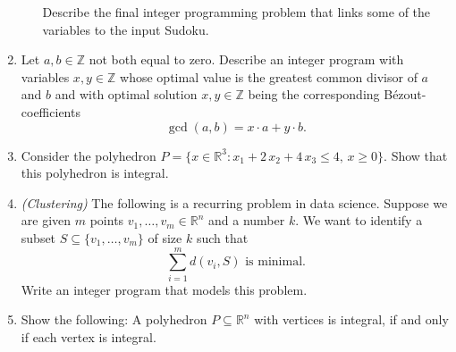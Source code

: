 \documentclass[11pt]{article}
\newcommand{\setR}{\mathbb{R}}
\renewcommand{\leq}{\leqslant}
\renewcommand{\geq}{\geqslant}
\begin{document}
\begin{enumerate}[1)]
\begin{enumerate}[a)]
    Describe the final integer programming problem that links some of the variables to the input Sudoku. 
    
  \end{enumerate}

\item Let $a, b ∈ℤ$ not both equal to zero. Describe an integer program with variables $x,y ∈ℤ$ whose optimal value is the greatest common divisor of $a$ and $b$ and with optimal solution $x,y ∈ℤ$ being the corresponding  Bézout-coefficients
  \begin{displaymath}
    \gcd(a,b) = x⋅a + y⋅b. 
  \end{displaymath}
  
 \item Consider the polyhedron $P = \{ x \in \setR^3 \colon x_1 + 2\,x_2 + 4\,
  x_3 \leq 4, \, x\geq0\}$. Show that this polyhedron is
  integral. 

\item \emph{(Clustering)} The following is a recurring problem in data science. Suppose we are given $m$ points $v_1,\dots,v_m ∈ ℝ^n$ and a number $k$. We want to identify a subset $S ⊆ \{v_1,\dots,v_m\}$ of size $k$ such that
  \begin{displaymath}
    ∑_{i=1}^m d(v_i, S)  \text{ is minimal.} 
  \end{displaymath}
  Write an integer program that models this problem.

  \item Show the following: A polyhedron $P \subseteq\setR^n$ with vertices is
  integral, if and only if each vertex is integral. \label{i:item:3}
  
  
\end{enumerate}



  
\end{document}
